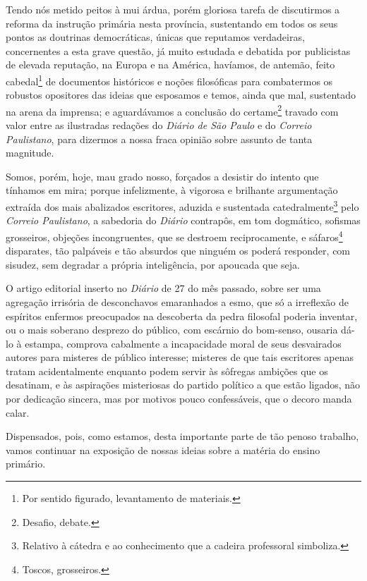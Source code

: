 Tendo nós metido peitos à mui árdua, porém gloriosa tarefa de
discutirmos a reforma da instrução primária nesta província, sustentando
em todos os seus pontos as doutrinas democráticas, únicas que reputamos
verdadeiras, concernentes a esta grave questão, já muito estudada e
debatida por publicistas de elevada reputação, na Europa e na América,
havíamos, de antemão, feito cabedal\footnote{Por sentido figurado,
  levantamento de materiais.} de documentos históricos e noções
filosóficas para combatermos os robustos opositores das ideias que
esposamos e temos, ainda que mal, sustentado na arena da imprensa; e
aguardávamos a conclusão do certame\footnote{Desafio, debate.} travado
com valor entre as ilustradas redações do \emph{Diário de São Paulo} e do
\emph{Correio Paulistano}, para dizermos a nossa fraca opinião sobre
assunto de tanta magnitude.

Somos, porém, hoje, mau grado nosso, forçados a desistir do intento que
tínhamos em mira; porque infelizmente, à vigorosa e brilhante
argumentação extraída dos mais abalizados escritores, aduzida e
sustentada catedralmente\footnote{Relativo à cátedra e ao conhecimento
  que a cadeira professoral simboliza.} pelo \emph{Correio Paulistano},
a sabedoria do \emph{Diário} contrapôs, em tom dogmático, sofismas
grosseiros, objeções incongruentes, que se destroem reciprocamente, e
sáfaros\footnote{Toscos, grosseiros.} disparates, tão palpáveis e tão
absurdos que ninguém os poderá responder, com sisudez, sem degradar a
própria inteligência, por apoucada que seja.

O artigo editorial inserto no \emph{Diário} de 27 do mês passado, sobre
ser uma agregação irrisória de desconchavos emaranhados a esmo, que só a
irreflexão de espíritos enfermos preocupados na descoberta da pedra
filosofal poderia inventar, ou o mais soberano desprezo do público, com
escárnio do bom-senso, ousaria dá-lo à estampa, comprova cabalmente a
incapacidade moral de seus desvairados autores para misteres de público
interesse; misteres de que tais escritores apenas tratam acidentalmente
enquanto podem servir às sôfregas ambições que os desatinam, e às
aspirações misteriosas do partido político a que estão ligados, não por
dedicação sincera, mas por motivos pouco confessáveis, que o decoro
manda calar.

Dispensados, pois, como estamos, desta importante parte de tão penoso
trabalho, vamos continuar na exposição de nossas ideias sobre a matéria
do ensino primário.

